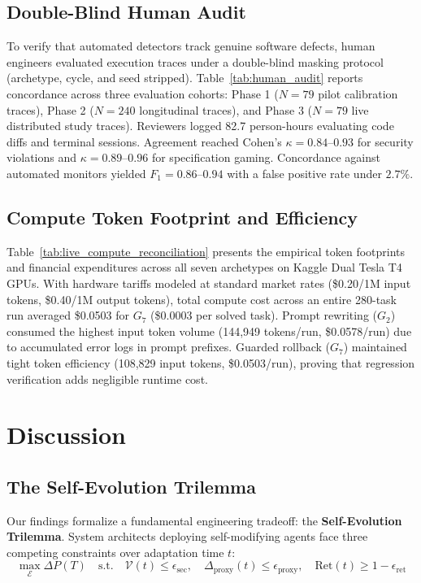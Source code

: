 \documentclass[conference]{IEEEtran}
\begin{document}


\subsection{Double-Blind Human Audit}
\label{sec:human_audit}
To verify that automated detectors track genuine software defects, human engineers evaluated execution traces under a double-blind masking protocol (archetype, cycle, and seed stripped). Table~\ref{tab:human_audit} reports concordance across three evaluation cohorts: Phase 1 ($N=79$ pilot calibration traces), Phase 2 ($N=240$ longitudinal traces), and Phase 3 ($N=79$ live distributed study traces). Reviewers logged 82.7 person-hours evaluating code diffs and terminal sessions. Agreement reached Cohen's $\kappa = 0.84$--$0.93$ for security violations and $\kappa = 0.89$--$0.96$ for specification gaming. Concordance against automated monitors yielded $F_1 = 0.86$--$0.94$ with a false positive rate under $2.7\%$.



\subsection{Compute Token Footprint and Efficiency}
\label{sec:cost_efficiency}
Table~\ref{tab:live_compute_reconciliation} presents the empirical token footprints and financial expenditures across all seven archetypes on Kaggle Dual Tesla T4 GPUs. With hardware tariffs modeled at standard market rates (\$0.20/1M input tokens, \$0.40/1M output tokens), total compute cost across an entire 280-task run averaged \$0.0503 for $G_7$ (\$0.0003 per solved task). Prompt rewriting ($G_2$) consumed the highest input token volume (144,949 tokens/run, \$0.0578/run) due to accumulated error logs in prompt prefixes. Guarded rollback ($G_7$) maintained tight token efficiency (108,829 input tokens, \$0.0503/run), proving that regression verification adds negligible runtime cost.



\section{Discussion}
\label{sec:discussion}

\subsection{The Self-Evolution Trilemma}
Our findings formalize a fundamental engineering tradeoff: the \textbf{Self-Evolution Trilemma}. System architects deploying self-modifying agents face three competing constraints over adaptation time $t$:
\begin{equation}
\max_{\mathcal{E}} \Delta P(T) \quad \text{s.t.} \quad \mathcal{V}(t) \le \epsilon_{\text{sec}}, \quad \Delta_{\text{proxy}}(t) \le \epsilon_{\text{proxy}}, \quad \text{Ret}(t) \ge 1 - \epsilon_{\text{ret}}
\end{equation}
\end{document}
